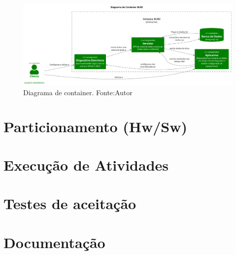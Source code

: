 \begin{figure}[ht]
    \centering
    \includegraphics[width=.94\textwidth]{img/conteiner-diagram.png}
    \caption{Diagrama de container. Fonte:Autor}\label{figConteinerDiagram}
\end{figure}

\section{Particionamento (Hw/Sw)}\label{fase3}

\section{Execução de Atividades}\label{fase4}

\section{Testes de aceitação}\label{fase5}

\section{Documentação}\label{fase6}